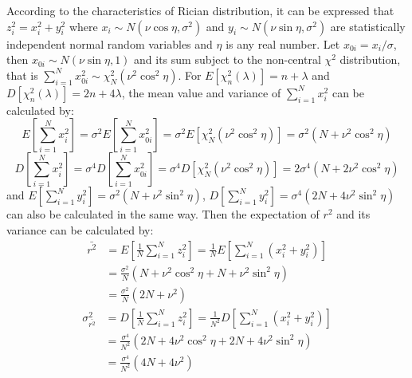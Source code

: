 According to the characteristics of Rician distribution, it can be expressed that $z_i^2=x_i^2+y_i^2$ where $x_i \sim N(\nu\cos \eta,\sigma^2)$ and $y_i \sim N(\nu\sin \eta,\sigma^2)$ are statistically independent normal random variables and $\eta$ is any real number. Let $x_{0i}=x_i/\sigma$, then $x_{0i} \sim N(\nu \sin \eta,1)$ and its sum subject to the non-central $\chi^2$ distribution, that is $\sum_{i=1}^{N}x_{0i}^2 \sim \chi_N^2(\nu^2\cos^2\eta)$. For $E[\chi_n^2(\lambda)]=n+\lambda$ and $D[\chi_n^2(\lambda)]=2n+4\lambda$, the mean value and variance of $\sum_{i=1}^{N}x_i^2$ can be calculated by:
\begin{equation}
    E\left[\sum_{i=1}^{N}x_i^2\right]=\sigma^2E\left[\sum_{i=1}^{N}x_{0i}^2\right]=\sigma^2E\left[\chi_N^2(\nu^2\cos^2\eta)\right]=\sigma^2\left(N+\nu^2\cos^2\eta\right)
\label{app:E_x}
\end{equation}
\begin{equation}
    D\left[\sum_{i=1}^{N}x_i^2\right]=\sigma^4D\left[\sum_{i=1}^{N}x_{0i}^2\right]=\sigma^4D\left[\chi_N^2(\nu^2\cos^2\eta)\right]=2\sigma^4\left(N+2\nu^2\cos^2\eta\right)
\label{app:D_x}
\end{equation}
and $E[\sum_{i=1}^{N}y_i^2]=\sigma^2(N+\nu^2\sin^2\eta)$, $D[\sum_{i=1}^{N}y_i^2]=\sigma^4(2N+4\nu^2\sin^2\eta)$ can also be calculated in the same way. Then the expectation of $r^2$ and its variance can be calculated by:
\begin{equation}
\begin{split}
    \bar{r^2}&=E\left[\frac{1}{N}\sum_{i=1}^{N}z_i^2\right]=\frac{1}{N}E\left[\sum_{i=1}^{N}(x_i^2+y_i^2)\right]\\
    &=\frac{\sigma^2}{N}\left(N+\nu^2\cos^2\eta+N+\nu^2\sin^2\eta\right)\\
    &=\frac{\sigma^2}{N}\left(2N+\nu^2\right)
\end{split}
\label{app:E_r2}
\end{equation}
\begin{equation}
\begin{split}
    \sigma_{\bar{r^2}}^2&=D\left[\frac{1}{N}\sum_{i=1}^{N}z_i^2\right]=\frac{1}{N^2}D\left[\sum_{i=1}^{N}\left(x_i^2+y_i^2\right)\right]\\
    &=\frac{\sigma^4}{N^2}\left(2N+4\nu^2\cos^2\eta+2N+4\nu^2\sin^2\eta\right)\\
    &=\frac{\sigma^4}{N^2}\left(4N+4\nu^2\right)
\end{split}
\label{app:D_r2}
\end{equation}

